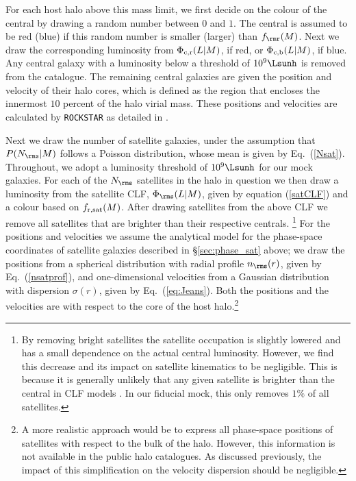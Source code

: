 \documentclass[fleqn,usenatbib,useAMS]{mnras}
\begin{document}
	For each host halo above this mass limit, we first decide on the colour of the central by drawing a random number between $0$ and $1$.  The central is assumed to be red (blue) if this random number is smaller (larger) than $f_\rmr(M)$. Next we draw the corresponding luminosity from $\Phi_{\rm c,r}(L|M)$, if red, or $\Phi_{\rm c,b}(L|M)$, if blue. Any central galaxy with a luminosity below a threshold of $10^9 \Lsunh$ is removed from the catalogue. The remaining central galaxies are given the position and velocity of their halo cores, which is defined as the region that encloses the innermost $10$ percent of the halo virial mass. These positions and velocities are calculated by \texttt{ROCKSTAR} as detailed in \citet{Behroozi+13}.
	
	Next we draw the number of satellite galaxies, under the assumption that $P(N_\rms|M)$ follows a Poisson distribution, whose mean is given by Eq.~(\ref{Nsat}). Throughout, we adopt a luminosity threshold of $10^9 \Lsunh$ for our mock galaxies. For each of the $N_\rms$ satellites in the halo in question we then draw a luminosity from the satellite CLF, $\Phi_\rms(L | M)$, given by equation (\ref{satCLF}) and a colour based on $f_{\rm r, sat}(M)$. After drawing satellites from the above CLF we remove all satellites that are brighter than their respective centrals. \footnote{By removing bright satellites the satellite occupation is slightly lowered and has a small dependence on the actual central luminosity. However, we find this decrease and its impact on satellite kinematics to be negligible. This is because it is generally unlikely that any given satellite is brighter than the central in CLF models \citep{Skibba+11, Lange+18a}. In our fiducial mock, this only removes $1\%$ of all satellites.} For the positions and velocities we assume the analytical model for the phase-space coordinates of satellite galaxies described in \S\ref{sec:phase_sat} above; we draw the positions from a spherical distribution with radial profile $n_\rms(r)$, given by Eq.~(\ref{nsatprof}), and one-dimensional velocities from a Gaussian distribution with dispersion $\sigma(r)$, given by Eq.~(\ref{eq:Jeans}). Both the positions and the velocities are with respect to the core of the host halo.\footnote{A more realistic approach would be to express all phase-space positions of satellites with respect to the bulk of the halo. However, this information is not available in the public halo catalogues. As discussed previously, the impact of this simplification on the velocity dispersion should be negligible.}
	
\end{document}
